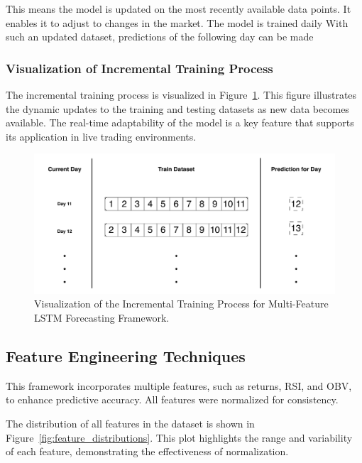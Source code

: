 This means the model is updated on the most recently available data points.
It enables it to adjust to changes in the market. The model is trained daily
With such an updated dataset, predictions of the following day can be made

\subsubsection{Visualization of Incremental Training Process}
The incremental training process is visualized in Figure~\ref{fig:incremental_training}. This figure illustrates the dynamic updates to the training and testing datasets as new data becomes available. The real-time adaptability of the model is a key feature that supports its application in live trading environments.

\begin{figure}[h!]
    \centering
    \includegraphics[width=\textwidth]{Images/incremental_training.pdf}
    \caption{Visualization of the Incremental Training Process for Multi-Feature LSTM Forecasting Framework.}
    \label{fig:incremental_training}
\end{figure}

\subsection{Feature Engineering Techniques}
This framework incorporates multiple features, such as returns, RSI, and OBV, to enhance predictive accuracy. All features were normalized for consistency. 

The distribution of all features in the dataset is shown in Figure~\ref{fig:feature_distributions}. This plot highlights the range and variability of each feature, demonstrating the effectiveness of normalization.

